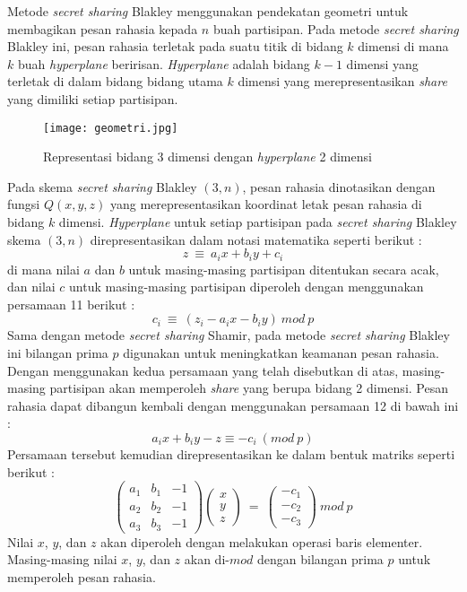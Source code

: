 \documentclass[a4paper,twoside]{article}
\begin{document}
\begin{enumerate}
\begin{itemize}
Metode \textit{secret sharing} Blakley menggunakan pendekatan geometri untuk membagikan pesan rahasia kepada $n$ buah partisipan. Pada metode \textit{secret sharing} Blakley ini, pesan rahasia terletak pada suatu titik di bidang $k$ dimensi di mana $k$ buah \textit{hyperplane} beririsan. \textit{Hyperplane} adalah bidang $k-1$ dimensi yang terletak di dalam bidang bidang utama $k$ dimensi yang merepresentasikan \textit{share} yang dimiliki setiap partisipan. 
\begin{figure}[H]
\centering
	\texttt{[image: geometri.jpg]}
	\caption{Representasi bidang 3 dimensi dengan \textit{hyperplane} 2 dimensi}
	\label{fig:geometri}
\end{figure}
Pada skema \textit{secret sharing} Blakley $(3,n)$, pesan rahasia dinotasikan dengan fungsi $Q(x,y,z)$ yang merepresentasikan koordinat letak pesan rahasia di bidang $k$ dimensi. \textit{Hyperplane} untuk setiap partisipan pada \textit{secret sharing} Blakley skema $(3,n)$ direpresentasikan dalam notasi matematika seperti berikut :
\begin{equation}
z \ \equiv \ a_{i}x + b_{i}y + c_{i}
\end{equation}
di mana nilai $a$ dan $b$ untuk masing-masing partisipan ditentukan secara acak, dan nilai $c$ untuk masing-masing partisipan diperoleh dengan menggunakan persamaan 11 berikut :
\begin{equation}
c_{i} \ \equiv \ (z_{i}-a_{i}x-b_{i}y) \ mod \ p
\end{equation}
Sama dengan metode \textit{secret sharing} Shamir, pada metode \textit{secret sharing} Blakley ini bilangan prima $p$ digunakan untuk meningkatkan keamanan pesan rahasia. Dengan menggunakan kedua persamaan yang telah disebutkan di atas, masing-masing partisipan akan memperoleh \textit{share} yang berupa bidang 2 dimensi. Pesan rahasia dapat dibangun kembali dengan menggunakan persamaan 12 di bawah ini :
\begin{equation}
a_{i}x+b_{i}y-z \equiv -c_{i} \ (mod \ p)
\end{equation}
Persamaan tersebut kemudian direpresentasikan ke dalam bentuk matriks seperti berikut :
\begin{equation}
\left(
\begin{array}{ccc}
 a_{1} & b_{1} & -1 \\ 
 a_{2} & b_{2} & -1 \\
 a_{3} & b_{3} & -1
\end{array}
\right)
\left(
\begin{array}{c}
 x \\ 
 y \\
 z
\end{array}
\right) \ = \ 
\left(
\begin{array}{c}
 -c_{1} \\ 
 -c_{2} \\
 -c_{3}
\end{array}
\right) \ mod \ p
\end{equation}
Nilai $x$, $y$, dan $z$ akan diperoleh dengan melakukan operasi baris elementer. Masing-masing nilai $x$, $y$, dan $z$ akan di-$mod$ dengan bilangan prima $p$ untuk memperoleh pesan rahasia.
\end{itemize}


\end{enumerate}
\end{document}
